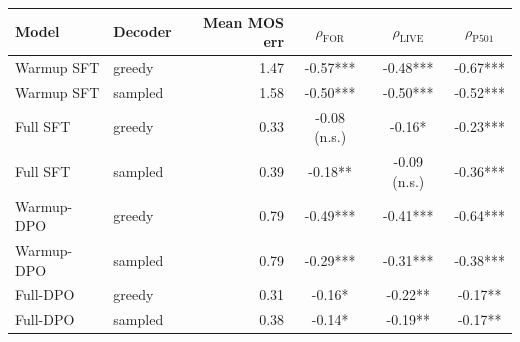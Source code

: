 \begin{tabular}{llrccc}
\toprule
Model & Decoder & Mean MOS err & $\rho_{\text{FOR}}$ & $\rho_{\text{LIVE}}$ & $\rho_{\text{P501}}$ \\
\midrule
Warmup SFT & greedy & 1.47 & -0.57*** & -0.48*** & -0.67*** \\
Warmup SFT & sampled & 1.58 & -0.50*** & -0.50*** & -0.52*** \\
Full SFT & greedy & 0.33 & -0.08 (n.s.) & -0.16* & -0.23*** \\
Full SFT & sampled & 0.39 & -0.18** & -0.09 (n.s.) & -0.36*** \\
Warmup-DPO & greedy & 0.79 & -0.49*** & -0.41*** & -0.64*** \\
Warmup-DPO & sampled & 0.79 & -0.29*** & -0.31*** & -0.38*** \\
Full-DPO & greedy & 0.31 & -0.16* & -0.22** & -0.17** \\
Full-DPO & sampled & 0.38 & -0.14* & -0.19** & -0.17** \\
\bottomrule
\end{tabular}
